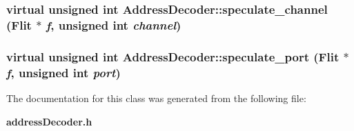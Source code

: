 \subsubsection[{speculate\_\-channel}]{\setlength{\rightskip}{0pt plus 5cm}virtual unsigned int AddressDecoder::speculate\_\-channel ({\bf Flit} $\ast$ {\em f}, \/  unsigned int {\em channel})\hspace{0.3cm}{\tt  [pure virtual]}}\label{classAddressDecoder_393586a5ded36349944cac2f9de11364}


\subsubsection[{speculate\_\-port}]{\setlength{\rightskip}{0pt plus 5cm}virtual unsigned int AddressDecoder::speculate\_\-port ({\bf Flit} $\ast$ {\em f}, \/  unsigned int {\em port})\hspace{0.3cm}{\tt  [pure virtual]}}\label{classAddressDecoder_a8622bef1f397accdc7f2d255bed7f6b}




The documentation for this class was generated from the following file:\begin{CompactItemize}
\item 
{\bf addressDecoder.h}\end{CompactItemize}
